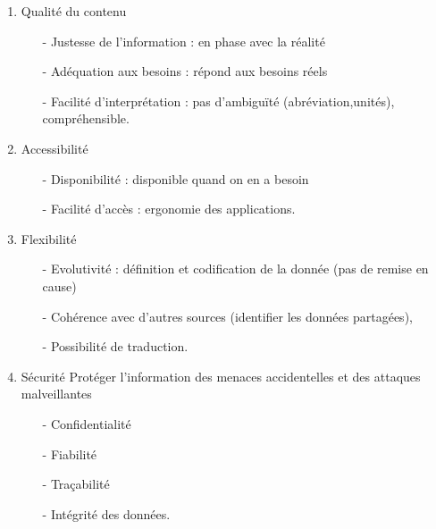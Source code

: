 \begin{enumerate}
\item {Qualité du contenu}
\begin{itemize}
\item[-]Justesse de l’information : en phase avec la réalité
\item[-]Adéquation aux besoins : répond aux besoins réels
\item[-]Facilité d'interprétation : pas d'ambiguïté (abréviation,unités), compréhensible.
\end{itemize}
\item {Accessibilité}
\begin{itemize}
\item[-]Disponibilité : disponible quand on en a besoin
\item[-]Facilité d’accès : ergonomie des applications.
\end{itemize}
\item {Flexibilité}
\begin{itemize}
\item[-]Evolutivité : définition et codification de la donnée (pas de remise en cause) 
\item[-]Cohérence avec d’autres sources (identifier les données partagées), 
\item[-]Possibilité de traduction.
\end{itemize}
\item {Sécurité}
Protéger l’information des menaces accidentelles et des attaques malveillantes
\begin{itemize}
\item[-]Confidentialité 
\item[-]Fiabilité 
\item[-]Traçabilité
\item[-]Intégrité des données.
\end{itemize}
\end{enumerate}


